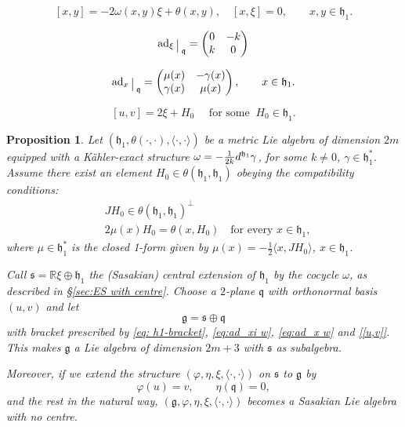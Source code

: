 \documentclass[10pt,a4paper]{amsart}
\newtheorem{prop}{Proposition}
\def\D{\textup{d}}
\def\R{\mathbb{R}}
\def\ad{\operatorname{ad}}
\def\g{\mathfrak{g}}
\def\h{\mathfrak{h}}
\def\pint{\langle \cdotp,\cdotp \rangle }
\def\q{\mathfrak{q}}
\newcommand{\restr}{\raisebox{-.2em}{$\!\big\arrowvert$}}
\def\s{\mathfrak s}
\begin{document}
\begin{equation}\label{eq: h1-bracket}
 [x,y]=-2\omega(x,y)\xi + \theta(x,y), \quad [x,\xi]=0, \qquad x,y \in \h_1.
\end{equation} 

\begin{equation}\label{eq:ad_xi w}
\ad_{\xi}\restr_{\q}=
\begin{pmatrix} 0 & -k \\ k & 0 \end{pmatrix}
\end{equation}

\begin{equation}\label{eq:ad_x w}
\ad_{x}\restr_{\q}=
\begin{pmatrix} \mu(x) & -\gamma(x) \\ \gamma(x) & \mu(x)
\end{pmatrix},\qquad x\in \h_1.
\end{equation}

\begin{equation} \label{[u,v]} 
    [u,v]=2\xi + H_{0}\quad \text{ for some }\ H_{0} \in \h_1.
\end{equation}

\begin{prop}\label{h1 crea sasaki sin centro}
    Let  $(\h_1, \theta(\cdot,\cdot), \pint)$ be a metric Lie algebra of dimension $2m$  equipped with a K{\"a}hler-exact structure $\omega=-\frac{1}{2k}\D^{\h_1}\gamma$, for some $k\neq 0$, $\gamma \in \h_{1}^*$.
 Assume there exist an element $H_0 \in \theta(\h_1,\h_1)$ obeying the compatibility conditions:
\begin{align}
    & JH_0 \in \theta(\h_1,\h_1)^{\perp}  \label{eq: JH0}\\ 
    & 2\mu(x)H_0=\theta(x,H_0) \quad \text{for every } x \in \h_1, \label{eq: importante}
\end{align}
where $\mu\in\h_1^*$ is the closed 1-form given by $\mu(x)=-\frac12\langle x,JH_0\rangle$, $x\in \h_1$. \par 
Call $\s= \R\xi \oplus \h_1$ the (Sasakian) central extension of $\h_1$ by the cocycle $\omega$, as described in \S \ref{sec:ES with centre}.  
Choose a $2$-plane ${\q}$ with orthonormal basis $(u,v)$ and let 
\[ \g=\s \oplus {\q}\]
with bracket prescribed by \eqref{eq: h1-bracket}, \eqref{eq:ad_xi w}, \eqref{eq:ad_x w} and \eqref{[u,v]}. This makes  $\g$ a Lie algebra of dimension $2m+3$ with $\s$ as subalgebra. \par
Moreover, if we extend the structure $(\varphi, \eta, \xi, \pint)$ on $\s$ to $\g$ by 
$$\varphi (u)=v,\qquad \eta({\q})=0,$$  
and the rest in the natural way, $(\g, \varphi, \eta, \xi , \pint)$ becomes a Sasakian Lie algebra with no centre.
\end{prop}
\end{document}
